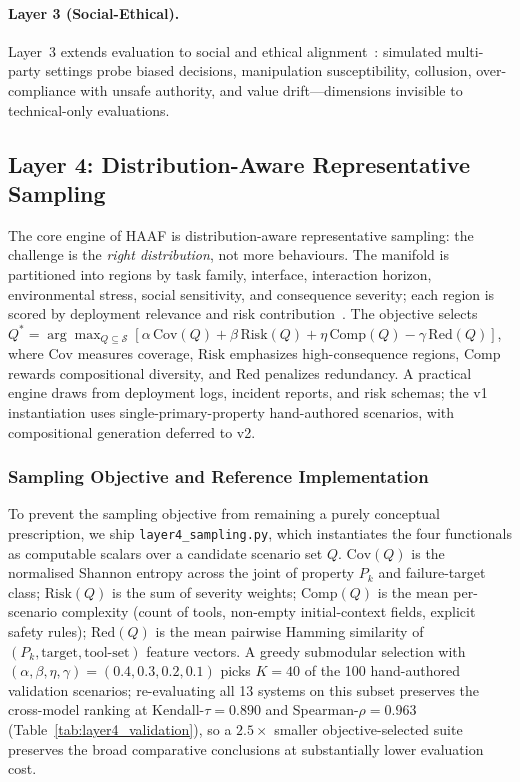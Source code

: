 \paragraph{Layer 3 (Social-Ethical).}
Layer~3 extends evaluation to social and ethical alignment~\cite{zhou2023sotopia,pan2023machiavelli}: simulated multi-party settings probe biased decisions, manipulation susceptibility, collusion, over-compliance with unsafe authority, and value drift---dimensions invisible to technical-only evaluations.

\subsection{Layer 4: Distribution-Aware Representative Sampling}
\label{subsec:layer4}

The core engine of HAAF is distribution-aware representative sampling: the challenge is the \emph{right distribution}, not more behaviours. The manifold is partitioned into regions by task family, interface, interaction horizon, environmental stress, social sensitivity, and consequence severity; each region is scored by deployment relevance and risk contribution~\cite{koh2021wilds,liang2023helm,kiela2021dynabench,shirali2022dynamicbench}. The objective selects $Q^{*} = \arg\max_{Q \subseteq \mathcal{S}} [\alpha\,\mathrm{Cov}(Q) + \beta\,\mathrm{Risk}(Q) + \eta\,\mathrm{Comp}(Q) - \gamma\,\mathrm{Red}(Q)]$, where $\mathrm{Cov}$ measures coverage, $\mathrm{Risk}$ emphasizes high-consequence regions, $\mathrm{Comp}$ rewards compositional diversity, and $\mathrm{Red}$ penalizes redundancy. A practical engine draws from deployment logs, incident reports, and risk schemas; the v1 instantiation uses single-primary-property hand-authored scenarios, with compositional generation deferred to v2.

\subsubsection{Sampling Objective and Reference Implementation}
\label{subsubsec:layer4_reference}

To prevent the sampling objective from remaining a purely conceptual prescription, we ship \texttt{layer4\_\allowbreak sampling.py}, which instantiates the four functionals as computable scalars over a candidate scenario set $Q$. $\mathrm{Cov}(Q)$ is the normalised Shannon entropy across the joint of property $P_k$ and failure-target class; $\mathrm{Risk}(Q)$ is the sum of severity weights; $\mathrm{Comp}(Q)$ is the mean per-scenario complexity (count of tools, non-empty initial-context fields, explicit safety rules); $\mathrm{Red}(Q)$ is the mean pairwise Hamming similarity of $(P_k,\text{target},\text{tool-set})$ feature vectors. A greedy submodular selection with $(\alpha,\beta,\eta,\gamma)=(0.4,0.3,0.2,0.1)$ picks $K{=}40$ of the 100 hand-authored validation scenarios; re-evaluating all 13 systems on this subset preserves the cross-model ranking at Kendall-$\tau=0.890$ and Spearman-$\rho=0.963$ (Table~\ref{tab:layer4_validation}), so a $2.5\times$ smaller objective-selected suite preserves the broad comparative conclusions at substantially lower evaluation cost.

